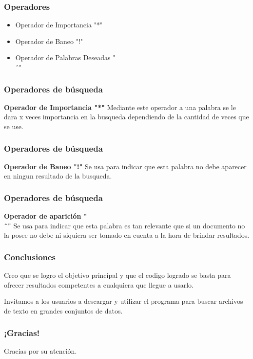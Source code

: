 \documentclass{beamer}
\begin{document}
\begin{frame}
    \frametitle{Operadores}
        \begin{itemize}
            \item Operador de Importancia "*"
            \item Operador de Baneo "!"
            \item Operador de Palabras Deseadas "\\ˆ"
        \end{itemize}
\end{frame}

\begin{frame}
    \frametitle{Operadores de búsqueda}
    \textbf{Operador de Importancia "*"}
    Mediante este operador a una palabra se le dara x veces importancia en la busqueda dependiendo de la cantidad de veces que se use.
\end{frame}

\begin{frame}
    \frametitle{Operadores de búsqueda}
    \textbf{Operador de Baneo "!"}
    Se usa para indicar que esta palabra no debe aparecer en ningun resultado de la busqueda.
\end{frame}
    

\begin{frame}
    \frametitle{Operadores de búsqueda}
    \textbf{Operador de aparición "\\ˆ"}
    Se usa para indicar que esta palabra es tan relevante que si un documento no la posee no debe ni siquiera ser tomado en cuenta a la hora de brindar resultados.
\end{frame}
    
    
    \begin{frame}
    \frametitle{Conclusiones}
    Creo que se logro el objetivo principal y que el codigo logrado se basta para ofrecer resultados competentes a cualquiera que llegue a usarlo.

    Invitamos a los usuarios a descargar y utilizar el programa para buscar archivos de texto en grandes conjuntos de datos.
\end{frame}

\begin{frame}
  \frametitle{¡Gracias!}
  Gracias por su atención.
\end{frame}
\end{document}
